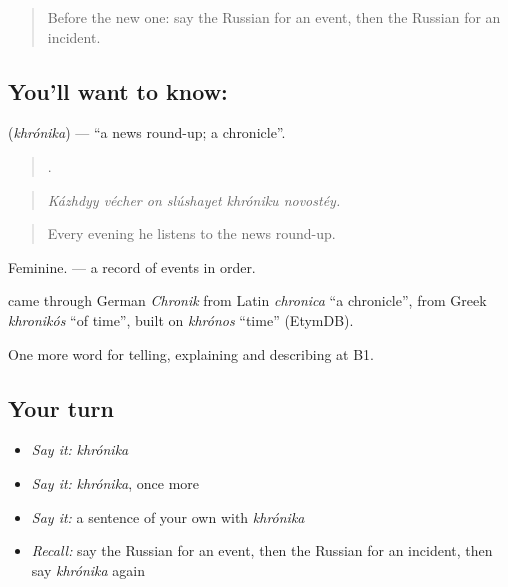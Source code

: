 \label{lesson:RU-C285-khronika}



\begin{quote}
Before the new one: say the Russian for an event, then the Russian for an incident.
\end{quote}

\subsection*{You'll want to know: }
\textbf{} (\emph{khrónika}) — \textquotedblleft{}a news round-up; a chronicle\textquotedblright{}.

\begin{quote}
     .
\end{quote}

\begin{quote}
\emph{Kázhdyy vécher on slúshayet khróniku novostéy.}
\end{quote}

\begin{quote}
Every evening he listens to the news round-up.
\end{quote}

Feminine. \emph{} — a record of events in order.

\begin{cousinweb}
\emph{} came through German \emph{Chronik} from Latin \emph{chronica} \textquotedblleft{}a chronicle\textquotedblright{}, from Greek \emph{khronikós} \textquotedblleft{}of time\textquotedblright{}, built on \emph{khrónos} \textquotedblleft{}time\textquotedblright{} (EtymDB).
\end{cousinweb}

\begin{grammarlens}[title={What you've built}]
One more word for telling, explaining and describing at B1.
\end{grammarlens}

\subsection*{Your turn}
\begin{itemize}
\raggedright
  \item \emph{Say it:} \emph{khrónika}
  \item \emph{Say it:} \emph{khrónika}, once more
  \item \emph{Say it:} a sentence of your own with \emph{khrónika}
  \item \emph{Recall:} say the Russian for an event, then the Russian for an incident, then say \emph{khrónika} again
\end{itemize}

